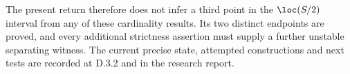 The present return therefore does not infer a third point in the
$\loc(S/2)$ interval from any of these cardinality results. Its two
distinct endpoints are proved, and every additional strictness assertion
must supply a further unstable separating witness. The current precise
state, attempted constructions and next tests are recorded at D.3.2 and
in the research report.
